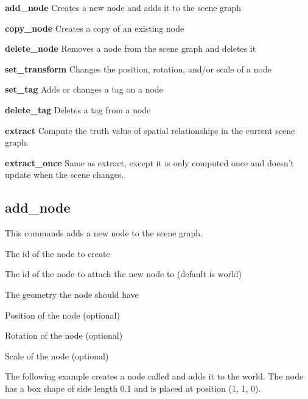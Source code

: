 \begin{description}
	\item{\textbf{add\_node}}
		Creates a new node and adds it to the scene graph
	\item{\textbf{copy\_node}}
		Creates a copy of an existing node
	\item{\textbf{delete\_node}}
		Removes a node from the scene graph and deletes it
	\item{\textbf{set\_transform}}
		Changes the position, rotation, and/or scale of a node
	\item{\textbf{set\_tag}}
		Adds or changes a tag on a node
	\item{\textbf{delete\_tag}}
		Deletes a tag from a node
	\item{\textbf{extract}}
		Compute the truth value of spatial relationships in the current scene graph.
	\item{\textbf{extract\_once}}
		Same as extract, except it is only computed once and doesn't update when the scene changes.
\end{description}


\subsection{add\_node}

This commands adds a new node to the scene graph.

\begin{description}
	\item{} The id of the node to create
	\item{} The id of the node to attach the new node to (default is world)
	\item{} The geometry the node should have
	\item{} Position of the node (optional)
	\item{} Rotation of the node (optional)
	\item{} Scale of the node (optional)
\end{description}

The following example creates a node called  and adds it to the world.
The node has a box shape of side length 0.1 and is placed at position (1, 1, 0).

